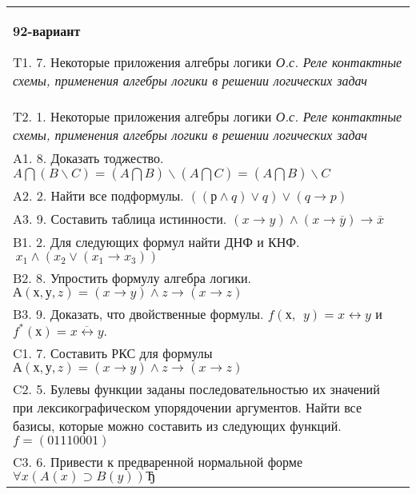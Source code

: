 \documentclass{article}
\begin{document}
\begin{tabular}{m{17cm}}
\textbf{92-вариант}
\newline

T1. 7. Некоторые приложения алгебры логики \emph{О.с. Реле контактные схемы, применения алгебры логики в решении логических задач} \\
T2. 1. Некоторые приложения алгебры логики \emph{О.с. Реле контактные схемы, применения алгебры логики в решении логических задач} \\
A1. 8. Доказать тоджество. \(A\bigcap(B\backslash C) = (A\bigcap B)\backslash(A\bigcap C) = (A\bigcap B)\backslash C\) \\
A2. 2. Найти все подформулы. \(\left( (р \land q) \vee q \right) \vee (q \rightarrow p)\) \\
A3. 9. Составить таблица истинности. \((x \rightarrow y) \land (x \rightarrow \overline{y}) \rightarrow \overline{x}\) \\
B1. 2. Для следующих формул найти ДНФ и КНФ. \(\ x_{1} \land (x_{2} \vee (x_{1} \rightarrow x_{3}))\) \\
B2. 8. Упростить формулу алгебра логики. \(А(х,у,z) = (x \rightarrow y) \land z \rightarrow (x \rightarrow z)\) \\
B3. 9. Доказать, что двойственные формулы. \(f(х,\ \ y) = x \leftrightarrow y\) и \(f^{*}(х) = \overline{x \leftrightarrow y}.\) \\
C1. 7. Составить РКС для формулы \(А(х,у,z) = (x \rightarrow y) \land z \rightarrow (x \rightarrow z)\) \\
C2. 5. Булевы функции заданы последовательностью их значений при лексикографическом упорядочении аргументов. Найти все базисы, которые можно составить из следующих функций. \(f = (01110001)\) \\
C3. 6. Привести к предваренной нормальной форме \(\forall x(A(x) \supset B(y))Ђ\) \\

\end{tabular}
\vspace{1cm}
\end{document}

